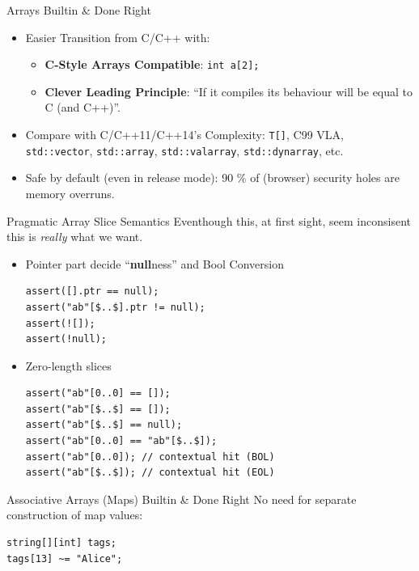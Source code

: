 \documentclass[xcolor=dvipsnames]{beamer}
\begin{document}
\begin{frame}[fragile]{Arrays Builtin \& Done Right}
  \begin{itemize}[<+->]
  \item Easier Transition from C/C++ with:
    \begin{itemize}[<+->]
    \item \textbf{C-Style Arrays Compatible}: \texttt{int a[2];}
    \item \textbf{Clever Leading Principle}: ``If it compiles its behaviour will be
      equal to C (and C++)''.
    \end{itemize}
  \item Compare with C/C++11/C++14’s Complexity: \texttt{T[]}, C99 VLA,
    \texttt{std::vector}, \texttt{std::array}, \texttt{std::valarray},
    \texttt{std::dynarray}, etc.
  \item Safe by default (even in release mode): 90 \% of (browser) security
    holes are memory overruns.
  \end{itemize}
\end{frame}

\begin{frame}[fragile]{Pragmatic Array Slice Semantics}
  Eventhough this, at first sight, seem inconsisent this is \emph{really} what
  we want.
  \begin{itemize}[<+->]

  \item Pointer part decide ``\textbf{null}ness'' and Bool Conversion
    \begin{lstlisting}[frame=single]
assert([].ptr == null);
assert("ab"[$..$].ptr != null);
assert(![]);
assert(!null);
    \end{lstlisting}

  \item Zero-length slices
    \begin{lstlisting}[frame=single]
assert("ab"[0..0] == []);
assert("ab"[$..$] == []);
assert("ab"[$..$] == null);
assert("ab"[0..0] == "ab"[$..$]);
assert("ab"[0..0]); // contextual hit (BOL)
assert("ab"[$..$]); // contextual hit (EOL)
    \end{lstlisting}

  \end{itemize}
\end{frame}

\begin{frame}[fragile]{Associative Arrays (Maps) Builtin \& Done Right}
  No need for separate construction of map values:
  \begin{lstlisting}[frame=single]
string[][int] tags;
tags[13] ~= "Alice";
  \end{lstlisting}
\end{frame}
\end{document}
